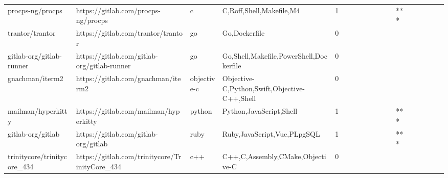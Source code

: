 \begin{tabular}{llllrlllllllllllll}
procps-ng/procps                                   &                https://gitlab.com/procps-ng/procps &                 c &                           C,Roff,Shell,Makefile,M4 &       1 &         &        &           &                &                 &        &           &       *** &          &          &       &              &          \\
trantor/trantor                                    &                 https://gitlab.com/trantor/trantor &                go &                                      Go,Dockerfile &       0 &         &        &           &                &                 &        &           &           &          &          &       &              &          \\
gitlab-org/gitlab-runner                           &        https://gitlab.com/gitlab-org/gitlab-runner &                go &            Go,Shell,Makefile,PowerShell,Dockerfile &       0 &         &        &           &                &                 &        &           &           &          &          &       &              &          \\
gnachman/iterm2                                    &                 https://gitlab.com/gnachman/iterm2 &       objective-c &       Objective-C,Python,Swift,Objective-C++,Shell &       0 &         &        &           &                &                 &        &           &           &          &          &       &              &          \\
mailman/hyperkitty                                 &              https://gitlab.com/mailman/hyperkitty &            python &                            Python,JavaScript,Shell &       1 &         &        &           &                &                 &        &           &       *** &          &          &       &              &          \\
gitlab-org/gitlab                                  &               https://gitlab.com/gitlab-org/gitlab &              ruby &                        Ruby,JavaScript,Vue,PLpgSQL &       1 &         &        &           &                &                 &        &           &       *** &          &          &       &              &          \\
trinitycore/trinitycore\_434                        &     https://gitlab.com/trinitycore/TrinityCore\_434 &               c++ &                   C++,C,Assembly,CMake,Objective-C &       0 &         &        &           &                &                 &        &           &           &          &          &       &              &          \\

\end{tabular}
